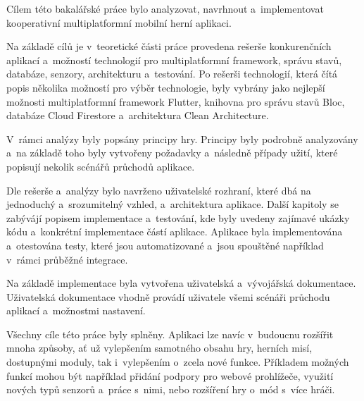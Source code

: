 \begin{conclusion}
Cílem této bakalářské práce bylo analyzovat, navrhnout a~implementovat
\mbox{kooperativní} multiplatformní mobilní herní aplikaci. 

Na základě cílů je v~teoretické části práce provedena rešerše
konkurenčních aplikací
a~možností technologií pro multiplatformní framework, správu stavů,
databáze, senzory, architekturu a~testování.
Po rešerši technologií,
která čítá popis několika možností pro výběr technologie,
byly vybrány jako nejlepší možnosti
multiplatformní framework Flutter,
knihovna pro správu stavů Bloc,
databáze Cloud Firestore
a~architektura Clean Architecture.

V~rámci analýzy byly popsány principy hry.
Principy byly podrobně analyzovány a~na základě toho byly vytvořeny
požadavky a~následně případy užití,
které popisují nekolik scénářů průchodů aplikace.

Dle rešerše a~analýzy bylo navrženo uživatelské rozhraní,
které dbá na jednoduchý a~srozumitelný vzhled,
a~architektura aplikace.
Další kapitoly se zabývájí popisem implementace a~testování,
kde byly uvedeny zajímavé ukázky kódu
a~konkrétní implementace částí aplikace.
Aplikace byla implementována a~otestována testy,
které jsou automatizované a~jsou spouštěné například v~rámci průběžné integrace.

Na základě implementace byla vytvořena uživatelská a~vývojářská dokumentace.
Uživatelská dokumentace vhodně provádí uživatele všemi scénáři průchodu
aplikací a~možnostmi nastavení.

Všechny cíle této práce byly splněny.
Aplikaci lze navíc v~budoucnu rozšířit mnoha způsoby,
ať už vylepšením samotného obsahu hry, herních misí, dostupnými moduly,
tak i~vylepšením o~zcela nové funkce.
Příkladem možných funkcí mohou být například
přidání podpory pro webové prohlížeče,
využití nových typů senzorů a~práce s~nimi,
nebo rozšíření hry o~mód s~více hráči.
\end{conclusion}
